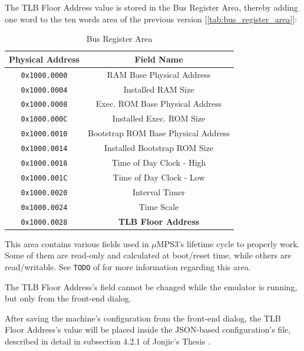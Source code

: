 \documentclass[12pt,a4paper,openright,twoside]{report}
\begin{document}
The TLB Floor Address value is stored in the Bus Register Area, thereby adding one word to the ten words area of the previous version [\autoref{tab:bus_register_area}]:
\begin{table}[h]
	\centering
	\renewcommand{\arraystretch}{0.98}
	\begin{tabular}{|c|c|}
		\hline
		Physical Address     & Field Name                          \\ \hline\hline
		\texttt{0x1000.0000} & RAM Base Physical Address           \\ \hline
		\texttt{0x1000.0004} & Installed RAM Size                  \\ \hline
		\texttt{0x1000.0008} & Exec. ROM Base Physical Address     \\ \hline
		\texttt{0x1000.000C} & Installed Exec. ROM Size            \\ \hline
		\texttt{0x1000.0010} & Bootstrap ROM Base Physical Address \\ \hline
		\texttt{0x1000.0014} & Installed Bootstrap ROM Size        \\ \hline
		\texttt{0x1000.0018} & Time of Day Clock - High            \\ \hline
		\texttt{0x1000.001C} & Time of Day Clock - Low             \\ \hline
		\texttt{0x1000.0020} & Interval Timer                      \\ \hline
		\texttt{0x1000.0024} & Time Scale                          \\ \hline
		\texttt{0x1000.0028} & \textbf{TLB Floor Address}          \\ \hline
	\end{tabular}
	\caption{Bus Register Area}
	\label{tab:bus_register_area}
\end{table}

This area contains various fields used in $\mu$MPS3's lifetime cycle to properly work.
Some of them are read-only and calculated at boot/reset time, while others are read/writable.
See \texttt{TODO} of \cite{pops} for more information regarding this area.

The TLB Floor Address's field cannot be changed while the emulator is running, but only from the front-end dialog.

After saving the machine's configuration from the front-end dialog, the TLB Floor Address's value will be placed inside the JSON-based configuration's file, described in detail in subsection 4.2.1 of Jonjic's Thesis \cite{tjonjic}.
\end{document}

